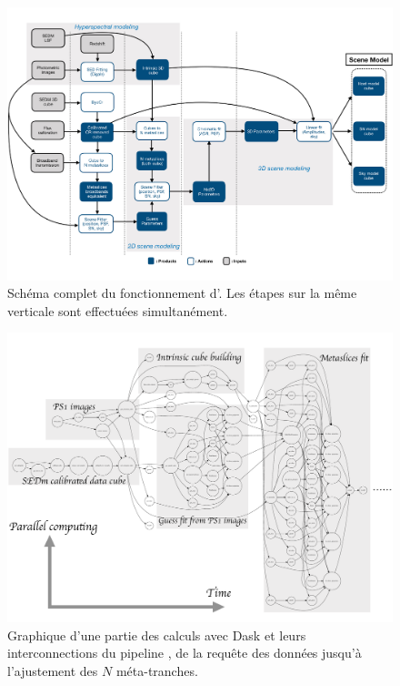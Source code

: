 \documentclass[../main/main.tex]{subfiles}
\begin{document}
\begin{landscape}
\begin{figure}
  \centering
  \includegraphics[width=0.99\linewidth]{../figures/07_scene/Fulldaghypergal.pdf}
  \caption{Schéma complet du fonctionnement d'\hypergal. Les étapes sur
    la même verticale sont effectuées simultanément.}
  \label{fig:fulldag}
\end{figure}
\end{landscape}


\begin{landscape}
\begin{figure}
  \centering
  \includegraphics[width=1.0\linewidth]{../figures/07_scene/mydask.pdf}
  \caption{Graphique d'une partie des calculs avec Dask et leurs interconnections du
    pipeline \hypergal, de la requête des données jusqu'à l'ajustement des $N$ méta-tranches.}
  \label{fig:dask}
\end{figure}
\end{landscape}
\end{document}
